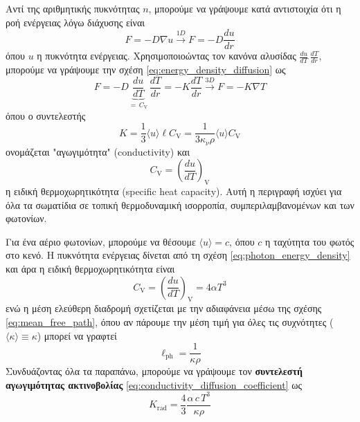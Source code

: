 Αντί της αριθμητικής πυκνότητας $n$, μπορούμε να γράψουμε κατά αντιστοιχία ότι η ροή ενέργειας λόγω διάχυσης είναι
\begin{equation}
    \label{eq:energy_density_diffusion}
    F = -D \nabla u \xrightarrow{1D} F = -D \frac{du}{dr}
\end{equation}
όπου $u$ η πυκνότητα ενέργειας. Χρησιμοποιοώντας τον κανόνα αλυσίδας $\frac{du}{dT} \,\frac{dT}{dr}$, μπορούμε να γράψουμε την σχέση \eqref{eq:energy_density_diffusion} ως
\begin{equation}
    \label{eq:temperature_gradient_diffusion_law}
    F = -D \underbrace{\frac{du}{dT}}_{= \,C_{\text{V}}} \,\frac{dT}{dr} = - K\frac{dT}{dr} \xrightarrow{3D} \boxed{F = -K \nabla T}
\end{equation}
όπου ο συντελεστής 
\begin{equation}
    \label{eq:conductivity_diffusion_coefficient}
    K = \frac{1}{3} \langle u \rangle \ell C_{\text{V}} = \frac{1}{3 \kappa_\nu \rho} \langle u \rangle C_{\text{V}}
\end{equation}
ονομάζεται "αγωγιμότητα" (conductivity) και 
\begin{equation}
    \label{eq:specific_heat_capacity}
    C_{\text{V}} = \left( \frac{du}{dT} \right)_{\text{V}}
\end{equation}
η ειδική θερμοχωρητικότητα (specific heat capacity). Αυτή η περιγραφή ισχύει για όλα τα σωματίδια σε τοπική θερμοδυναμική ισορροπία, συμπεριλαμβανομένων και των φωτονίων. 

Για ένα αέριο φωτονίων, μπορούμε να θέσουμε $\langle u \rangle = c$, όπου $c$ η ταχύτητα του φωτός στο κενό. Η πυκνότητα ενέργειας δίνεται από τη σχέση \eqref{eq:photon_energy_density} και άρα η ειδική θερμοχωρητικότητα είναι
\begin{equation*}
    C_{\text{V}} = \left( \frac{du}{dT} \right)_{\text{V}} = 4 \alpha T^3
\end{equation*}
ενώ η μέση ελεύθερη διαδρομή σχετίζεται με την αδιαφάνεια μέσω της σχέσης \eqref{eq:mean_free_path}, όπου αν πάρουμε την μέση τιμή για όλες τις συχνότητες ($\langle \kappa \rangle \equiv \kappa$) μπορεί να γραφτεί
\begin{equation*}
    \ell_{\text{ph}} = \frac{1}{\kappa \rho}
\end{equation*}
Συνδυάζοντας όλα τα παραπάνω, μπορούμε να γράψουμε τον \textbf{συντελεστή αγωγιμότητας ακτινοβολίας} \eqref{eq:conductivity_diffusion_coefficient} ως
\begin{equation}
    \label{eq:radiation_conductivity_coefficient}
    K_{\text{rad}} = \frac{4}{3} \frac{\alpha \,c \,T^3}{\kappa \rho}
\end{equation}


